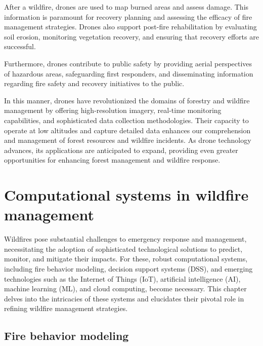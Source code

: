 \documentclass[
  12 pt,
]{Nemilov}
\begin{document}
After a wildfire, drones are used to map burned areas and assess damage. This information is paramount for recovery planning and assessing the efficacy of fire management strategies. Drones also support post-fire rehabilitation by evaluating soil erosion, monitoring vegetation recovery, and ensuring that recovery efforts are successful.

Furthermore, drones contribute to public safety by providing aerial perspectives of hazardous areas, safeguarding first responders, and disseminating information regarding fire safety and recovery initiatives to the public.

In this manner, drones have revolutionized the domains of forestry and wildfire management by offering high-resolution imagery, real-time monitoring capabilities, and sophisticated data collection methodologies. Their capacity to operate at low altitudes and capture detailed data enhances our comprehension and management of forest resources and wildfire incidents. As drone technology advances, its applications are anticipated to expand, providing even greater opportunities for enhancing forest management and wildfire response.

\chapter{Computational systems in wildfire management}\label{comp-systems}

Wildfires pose substantial challenges to emergency response and management, necessitating the adoption of sophisticated technological solutions to predict, monitor, and mitigate their impacts. For these, robust computational systems, including fire behavior modeling, decision support systems (DSS), and emerging technologies such as the Internet of Things (IoT), artificial intelligence (AI), machine learning (ML), and cloud computing, become necessary. This chapter delves into the intricacies of these systems and elucidates their pivotal role in refining wildfire management strategies.

\section{Fire behavior modeling}\label{fire-behavior-modeling}
\end{document}

